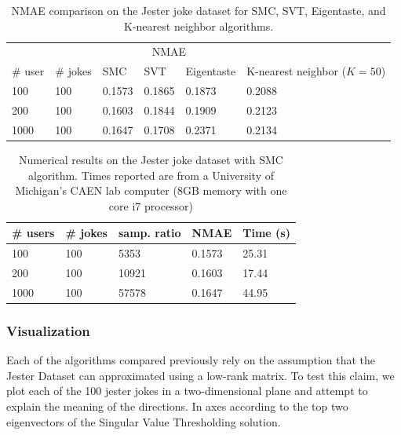\documentclass{article} %
\newcommand{\mc}[2]{\multicolumn{#1}{#2}}
\begin{document}
\begin{table} [h]
\centering
\caption{NMAE comparison on the Jester joke dataset for SMC, SVT, Eigentaste, and K-nearest neighbor algorithms.}
 \begin{tabular}{l l | l l l l}%
  \hline \hline
   & & \mc{3}{c}{NMAE}\\
  \# user & \# jokes & SMC  & SVT & Eigentaste & K-nearest neighbor ($K=50$)\\
\hline
100 & 100 & 0.1573 & 0.1865 &0.1873 & 0.2088\\
200 & 100 & 0.1603 & 0.1844 & 0.1909 & 0.2123\\
1000 & 100 & 0.1647& 0.1708 & 0.2371 & 0.2134\\
\hline \hline
\end{tabular}
\label{Compare} 
\end{table}

\begin{table} [h]
\centering
 \caption{Numerical results on the Jester joke dataset with SMC
   algorithm. Times reported are from a University of Michigan's CAEN
   lab computer (8GB memory with one core i7 processor)}
 \begin{tabular}{l l l l l}%
   \hline \hline
   \# users & \# jokes & samp. ratio & NMAE & Time (s)\\
   \hline
   100 & 100 & 5353 & 0.1573 & 25.31\\
   200 & 100 & 10921 & 0.1603 & 17.44\\
   1000 & 100 & 57578 & 0.1647 & 44.95\\
   \hline \hline
 \end{tabular}

\label{SMC}
\end{table}

\subsubsection{Visualization}

Each of the algorithms compared previously rely on the assumption that
the Jester Dataset can approximated using a low-rank matrix. To test
this claim, we plot each of the 100 jester jokes in a two-dimensional
plane and attempt to explain the meaning of the directions. In axes
according to the top two eigenvectors of the Singular Value
Thresholding solution.
\end{document}
